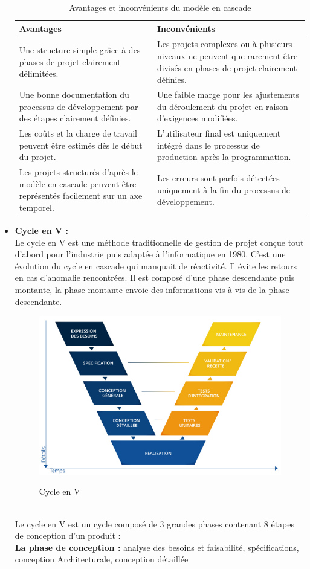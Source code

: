 \documentclass[a4paper, 12pt]{report}
\begin{document}
\begin{itemize}
\begin{table}[H]
\begin{tabular}{|p{6cm}|p{6cm}|} 
\hline  
\centering \textbf{Avantages} & \raggedright  \textbf{Inconvénients} \tabularnewline  
\hline
\raggedright Une structure simple grâce à des phases de projet clairement délimitées.&  Les projets complexes ou à plusieurs niveaux ne peuvent que rarement être divisés en phases de projet clairement définies.   \tabularnewline  
\hline  
\raggedright Une bonne documentation du processus de développement par des étapes clairement définies. & Une faible marge pour les ajustements du déroulement du projet en raison d’exigences modifiées. \tabularnewline
\hline
\raggedright Les coûts et la charge de travail peuvent être estimés dès le début du projet. & L’utilisateur final est uniquement intégré dans le processus de production après la programmation. \tabularnewline
\hline
\raggedright Les projets structurés d’après le modèle en cascade peuvent être représentés facilement sur un axe temporel. & Les erreurs sont parfois détectées uniquement à la fin du processus de développement. \tabularnewline
\hline
\end{tabular}
\caption{Avantages et inconvénients du modèle en cascade}
\end{table}

  \item \textbf{Cycle en V :} \\
  Le cycle en V est une méthode traditionnelle de gestion de projet conçue tout d’abord pour l’industrie puis adaptée à l’informatique en 1980. C’est une évolution du cycle en cascade qui manquait de réactivité. Il évite les retours en cas d’anomalie rencontrées. Il est composé d’une phase descendante puis montante, la phase montante envoie des informations vis-à-vis de la phase descendante. \\
  \begin{figure}[!h]
    \centering
    \includegraphics[width = 1\linewidth]{img/cycle-en-V.png}\cite{cycle_en_v}
    \caption{Cycle en V}
 \end{figure}\\
  Le cycle en V est un cycle composé de 3 grandes phases contenant 8 étapes de conception d’un produit : \\
  \textbf{La phase de conception :} analyse des besoins et faisabilité, spécifications, conception Architecturale, conception détaillée 


\end{itemize}
\end{document}
